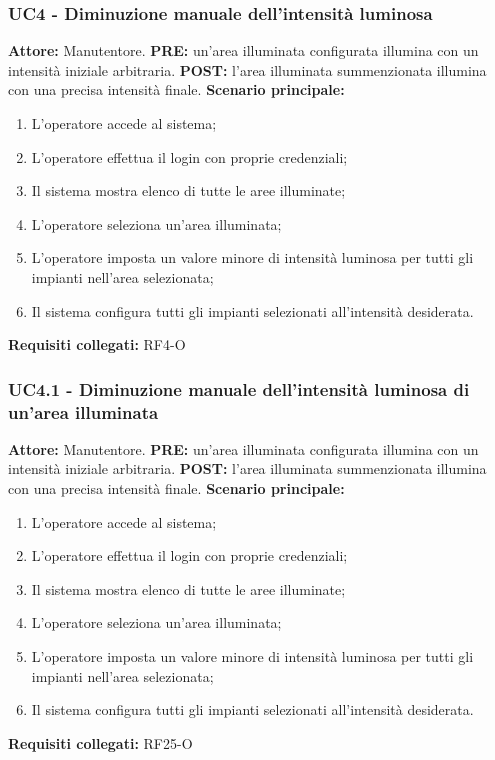 \documentclass[a4paper, 12pt]{article}
\begin{document}
\subsubsection{UC4 - Diminuzione manuale dell'intensità luminosa}
\textbf{Attore:} Manutentore.\newline
\textbf{PRE:} un'area illuminata configurata illumina con un intensità iniziale arbitraria.\newline
\textbf{POST:} l'area illuminata summenzionata illumina con una precisa intensità finale.\newline
\textbf{Scenario principale:}
\begin{enumerate}
    \item L'operatore accede al sistema;
    \item L'operatore effettua il login con proprie credenziali;
    \item Il sistema mostra elenco di tutte le aree illuminate;
    \item L'operatore seleziona un'area illuminata;
    \item L'operatore imposta un valore minore di intensità luminosa per tutti gli impianti nell'area selezionata;
    \item Il sistema configura tutti gli impianti selezionati all'intensità desiderata.
\end{enumerate}
\textbf{Requisiti collegati:} RF4-O\newline

\subsubsection{UC4.1 - Diminuzione manuale dell'intensità luminosa di un'area illuminata}
\textbf{Attore:} Manutentore.\newline
\textbf{PRE:} un'area illuminata configurata illumina con un intensità iniziale arbitraria.\newline
\textbf{POST:} l'area illuminata summenzionata illumina con una precisa intensità finale.\newline
\textbf{Scenario principale:}
\begin{enumerate}
    \item L'operatore accede al sistema;
    \item L'operatore effettua il login con proprie credenziali;
    \item Il sistema mostra elenco di tutte le aree illuminate;
    \item L'operatore seleziona un'area illuminata;
    \item L'operatore imposta un valore minore di intensità luminosa per tutti gli impianti nell'area selezionata;
    \item Il sistema configura tutti gli impianti selezionati all'intensità desiderata.
\end{enumerate}
\textbf{Requisiti collegati:} RF25-O\newline
\end{document}
